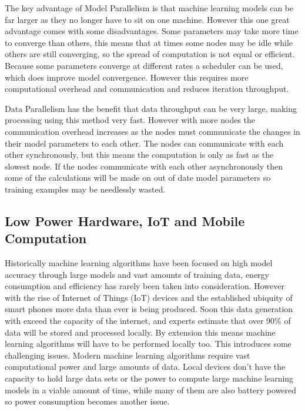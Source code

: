The key advantage of Model Parallelism is that machine learning models can be
far larger as they no longer have to sit on one machine. However this one great
advantage comes with some disadvantages. Some parameters may take more time to
converge than others, this means that at times some nodes may be idle while
others are still converging, so the spread of computation is not equal or
efficient. \cite{Dean2012Distbelief} Because some parameters converge at
different rates a scheduler can be used, which does improve model convergence.
However this requires more computational overhead and communication and reduces
iteration throughput.
\cite{kim2016STRADS}

Data Parallelism has the benefit that data throughput can be very large, making
processing using this method very fast. However with more nodes the
communication overhead increases as the nodes must communicate the changes in
their model parameters to each other. \cite{elgabli2020gadmm} The nodes can
communicate with each other synchronously, but this means the computation is
only as fast as the slowest node. If the nodes communicate with each other
asynchronously then some of the calculations will be made on out of date model
parameters so training examples may be needlessly wasted.

\subsection{Low Power Hardware, IoT and Mobile Computation}

Historically machine learning algorithms have been focused on high model
accuracy through large models and vast amounts of training data, energy
consumption and efficiency has rarely been taken into consideration. However
with the rise of Internet of Things (IoT) devices and the established ubiquity
of smart phones more data than ever is being produced. Soon this data generation
with exceed the capacity of the internet, and experts estimate that over 90\% of
data will be stored and processed locally. \cite{Chaing2016FogIoT} By extension
this means machine learning algorithms will have to be performed locally too.
This introduces some challenging issues. Modern machine learning algorithms
require vast computational power and large amounts of data. Local devices don't
have the capacity to hold large data sets or the power to compute large machine
learning models in a viable amount of time, while many of them are also battery
powered so power consumption becomes another issue.

